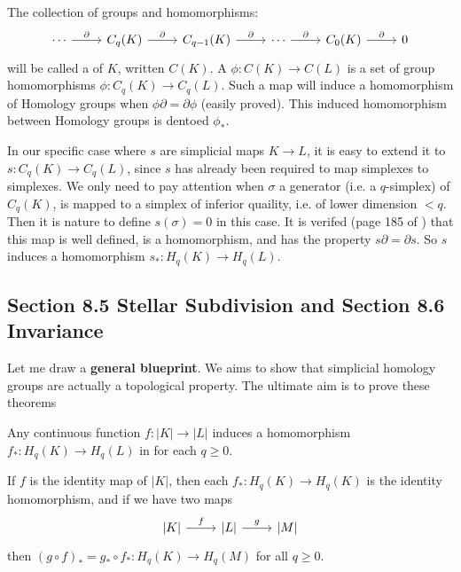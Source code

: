 The collection of groups and homomorphisms:
$$\begin{tikzcd}[]
    \cdots \ar[r,"\partial"] & C_q(K) \ar[r,"\partial"] &
    C_{q-1}(K) \ar[r,"\partial"] & \cdots \ar[r,"\partial"] &
    C_0(K) \ar[r,"\partial"] & 0
\end{tikzcd}$$
will be called a  of $K$, written $C(K)$. 
A  $\phi:C(K)\to C(L)$ is a set of group
homomorphisms $\phi:C_q(K)\to C_q(L)$. Such a map will induce a
homomorphism of Homology groups when $\phi\partial=\partial\phi$
(easily proved). This induced homomorphism between Homology groups is
dentoed $\phi_*$.

In our specific case where $s$ are simplicial maps $K\to L$, it is
easy to extend it to $s:C_q(K)\to C_q(L)$, since $s$ has already been
required to map simplexes to simplexes. We only need to pay attention
when $\sigma$ a generator (i.e. a $q$-simplex) of $C_q(K)$, is mapped
to a simplex of inferior quaility, i.e. of lower dimension $<q$. Then
it is nature to define $s(\sigma)=0$ in this case. It is verifed (page
185 of \cite{book}) that this map is well defined, is a homomorphism,
and has the property $s\partial=\partial s$. So $s$ induces a
homomorphism $s_*:H_q(K)\to H_q(L)$.

\subsection{Section 8.5 Stellar Subdivision and Section 8.6 Invariance}
\label{sec:Stellar-Subdivision-Invariance}

Let me draw a \textbf{general blueprint}. We aims to
show that simplicial homology groups are actually a topological
property. The ultimate aim is to prove these theorems

\begin{thm}
    Any continuous function $f:|K|\to |L|$ induces a homomorphism
    $f_*:H_q(K)\to H_q(L)$ in for each $q \geq 0$.
\end{thm}

\begin{thm}
    If $f$ is the identity map of $|K|$, then each 
    $f_*:H_q(K)\to H_q(K)$ is the identity homomorphism, and if we
    have two maps
    $$ \begin{tikzcd}[]
        \lvert K\rvert\ar[r,"f"] & \lvert L\rvert\ar[r,"g"] 
        & \lvert M\rvert
    \end{tikzcd}$$
    then $(g\circ f)_* = g_*\circ f_*: H_q(K)\to H_q(M)$
    for all $q\geq 0$.
\end{thm}

